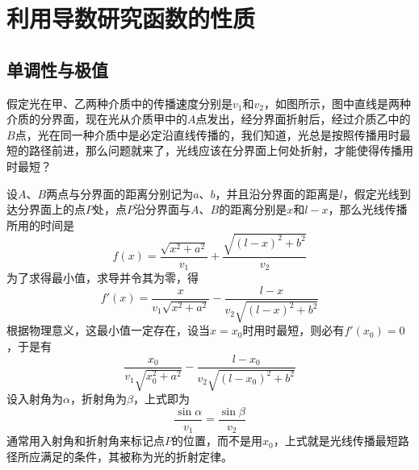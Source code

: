 
\section{利用导数研究函数的性质}
\label{sec:research-function-use-derivative}

\subsection{单调性与极值}
\label{sec:research-monotonicity-and-minmax-value}

\begin{example}[光的折射定律]
  假定光在甲、乙两种介质中的传播速度分别是$v_1$和$v_2$，如图所示，图中直线是两种介质的分界面，现在光从介质甲中的$A$点发出，经分界面折射后，经过介质乙中的$B$点，光在同一种介质中是必定沿直线传播的，我们知道，光总是按照传播用时最短的路径前进，那么问题就来了，光线应该在分界面上何处折射，才能使得传播用时最短？

  设$A$、$B$两点与分界面的距离分别记为$a$、$b$，并且沿分界面的距离是$l$，假定光线到达分界面上的点$P$处，点$P$沿分界面与$A$、$B$的距离分别是$x$和$l-x$，那么光线传播所用的时间是
  \[ f(x) = \frac{\sqrt{x^2+a^2}}{v_1}+\frac{\sqrt{(l-x)^2+b^2}}{v_2} \]
  为了求得最小值，求导并令其为零，得
  \[ f'(x) = \frac{x}{v_1\sqrt{x^2+a^2}} - \frac{l-x}{v_2 \sqrt{(l-x)^2+b^2}} \]
  根据物理意义，这最小值一定存在，设当$x=x_0$时用时最短，则必有$f'(x_0)=0$，于是有
  \[ \frac{x_0}{v_1\sqrt{x_0^2+a^2}} - \frac{l-x_0}{v_2 \sqrt{(l-x_0)^2+b^2}}\]
  设入射角为$\alpha$，折射角为$\beta$，上式即为
  \[ \frac{\sin{\alpha}}{v_1} = \frac{\sin{\beta}}{v_2} \]
  通常用入射角和折射角来标记点$P$的位置，而不是用$x_0$，上式就是光线传播最短路径所应满足的条件，其被称为光的折射定律。
\end{example}

